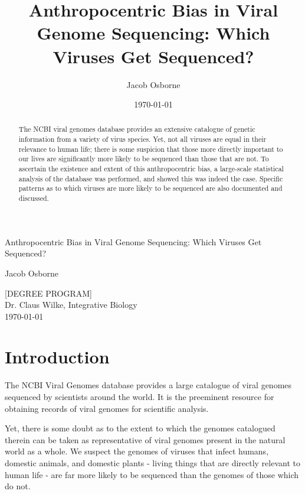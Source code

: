 \documentclass[12pt]{article}
\title{Anthropocentric Bias in Viral Genome Sequencing: Which Viruses Get Sequenced?}
\date{\today}
\author{Jacob Osborne}
\begin{document}
    \begin{titlepage}
        \begin{center}
            \vspace*{1in}
            \LARGE
            Anthropocentric Bias in Viral Genome Sequencing: Which Viruses Get Sequenced?

            \vspace*{1in}
            \large
            Jacob Osborne

            \vfill
            [DEGREE PROGRAM] \\
            Dr. Claus Wilke, Integrative Biology \\
            \today
        \end{center}
    \end{titlepage}
    
    \begin{abstract}
        The NCBI viral genomes database provides an extensive catalogue of genetic
        information from a variety of virus species. Yet, not all viruses are equal
        in their relevance to human life; there is some suspicion that those more
        directly important to our lives are significantly more likely to be
        sequenced than those that are not. To ascertain the existence and extent
        of this anthropocentric bias, a large-scale statistical analysis of the
        database was performed, and showed this was indeed the case.
        Specific patterns as to which viruses are more likely  to be sequenced
        are also documented and discussed.
    \end{abstract}

    \section{Introduction}

    The NCBI Viral Genomes database provides a large catalogue of viral genomes 
    sequenced by scientists around the world. It is the preeminent resource for
    obtaining records of viral genomes for scientific analysis.

    Yet, there is some doubt as to the extent to which the genomes catalogued
    therein can be taken as representative of viral genomes present in the
    natural world as a whole. We suspect the genomes of viruses that infect
    humans, domestic animals, and domestic plants - living things that are
    directly relevant to human life - are far more likely to be sequenced than
    the genomes of those which do not.
\end{document}
